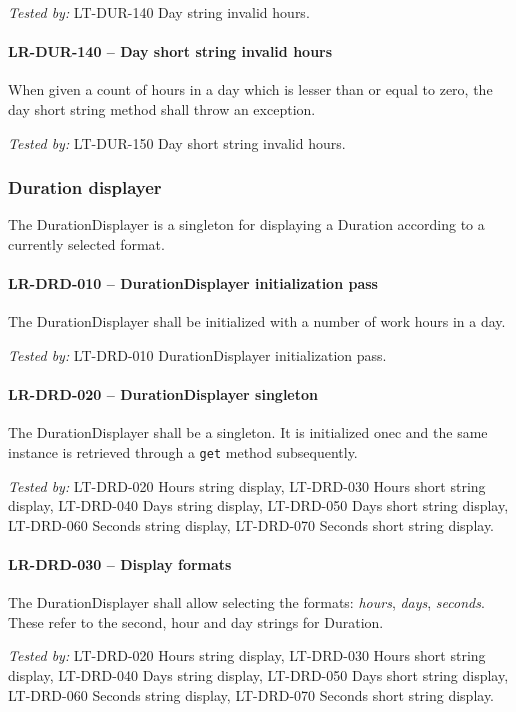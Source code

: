 \textit{Tested by: } LT-DUR-140 Day string invalid hours.

\paragraph{LR-DUR-140 -- Day short string invalid hours}
When given a count of hours in a day which is lesser than or equal to zero,
the day short string method shall throw an exception.

\textit{Tested by: } LT-DUR-150 Day short string invalid hours.

\subsubsection{Duration displayer}
The DurationDisplayer is a singleton for displaying a Duration according
to a currently selected format.

\paragraph{LR-DRD-010 -- DurationDisplayer initialization pass}
The DurationDisplayer shall be initialized with a number of work hours
in a day.

\textit{Tested by: } LT-DRD-010 DurationDisplayer initialization pass.

\paragraph{LR-DRD-020 -- DurationDisplayer singleton}
The DurationDisplayer shall be a singleton. It is initialized onec and
the same instance is retrieved through a \lstinline{get} method
subsequently.

\textit{Tested by: } LT-DRD-020 Hours string display,
LT-DRD-030 Hours short string display,
LT-DRD-040 Days string display,
LT-DRD-050 Days short string display,
LT-DRD-060 Seconds string display,
LT-DRD-070 Seconds short string display.

\paragraph{LR-DRD-030 -- Display formats}
The DurationDisplayer shall allow selecting the formats: \emph{hours},
\emph{days}, \emph{seconds}.
These refer to the second, hour and day strings for Duration.

\textit{Tested by: } LT-DRD-020 Hours string display,
LT-DRD-030 Hours short string display,
LT-DRD-040 Days string display,
LT-DRD-050 Days short string display,
LT-DRD-060 Seconds string display,
LT-DRD-070 Seconds short string display.

